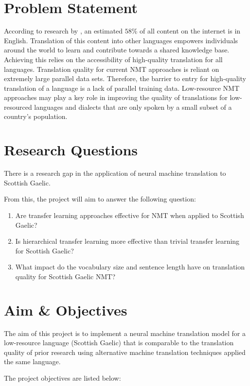 \section{Problem Statement}
According to research by \cite{w3_internet_2020}, an estimated $58$\% of all content on the internet is in English. Translation of this content into other languages empowers individuals around the world to learn and contribute towards a shared knowledge base. Achieving this relies on the accessibility of high-quality translation for all languages. Translation quality for current \acrshort{NMT} approaches is reliant on extremely large parallel data sets. Therefore, the barrier to entry for high-quality translation of a language is a lack of parallel training data. Low-resource \acrshort{NMT} approaches may play a key role in improving the quality of translations for low-resourced languages and dialects that are only spoken by a small subset of a country's population.


\section{Research Questions}
There is a research gap in the application of neural machine translation to Scottish Gaelic.

From this, the project will aim to answer the following question:

\begin{enumerate}
    \item Are transfer learning approaches effective for \acrshort{NMT} when applied to Scottish Gaelic?
    \item Is hierarchical transfer learning more effective than trivial transfer learning for Scottish Gaelic?
    \item What impact do the vocabulary size and sentence length have on translation quality for Scottish Gaelic \acrshort{NMT}?
    
\end{enumerate}

\section{Aim \& Objectives}
The aim of this project is to implement a neural machine translation model for a low-resource language (Scottish Gaelic) that is comparable to the translation quality of prior research using alternative machine translation techniques applied the same language.

The project objectives are listed below:

